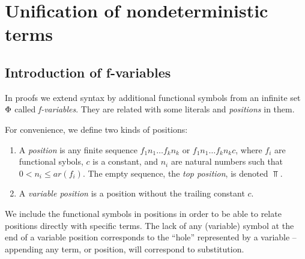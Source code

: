 %
\section{Unification of nondeterministic terms}\label{se:unification}

\subsection{Introduction of f-variables}

In proofs we extend syntax by additional functional symbols from an infinite
set \(\Phi\) called {\em f-variables}.  They are related with some literals
and {\em positions} in them. 
%
%
%
\begin{definition}\label {def:position}
For convenience, we define two kinds of positions:
\begin{enumerate}\smallerspaces
\item A {\em position} is any finite sequence \(f_1n_1\ldots f_kn_k\) or
\(f_1n_1\ldots f_kn_kc\), where $f_i$ %
are functional sybols, $c$ is a
constant, and $n_i$ %
are natural numbers such that \(0< n_i\leq
ar(f_i)\).  The empty sequence, the {\em top position}, is denoted
\(\Top\).
\item A {\em variable position} is a position without the trailing constant $c$.
\end{enumerate}
\end{definition}
We include the functional symbols in positions in order to be able to relate
positions directly with specific terms. The lack of any (variable) symbol at the 
end of a variable position corresponds to the ``hole'' represented by a variable
-- appending any term, or position, will correspond to substitution.

